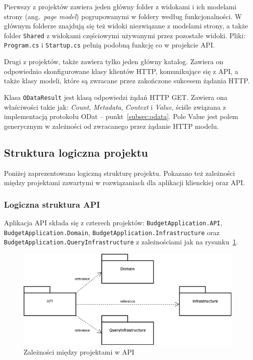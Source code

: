 Pierwszy z projektów zawiera jeden główny folder z widokami i ich modelami strony (ang.~\emph{page model}) pogrupowanymi w foldery według funkcjonalności. W głównym folderze znajdują się też widoki niezwiązane z modelami strony, a także folder \texttt{Shared} z widokami częściowymi używanymi przez pozostałe widoki. Pliki: \texttt{Program.cs} i \texttt{Startup.cs} pełnią podobną funkcję co w projekcie API.

Drugi z projektów, także zawiera tylko jeden główny katalog. Zawiera on odpowiednio skonfigurowane klasy klientów HTTP, komunikujące się z API, a także klasy modeli, które są zwracane przez zakończone sukcesem żądania HTTP.

Klasa \texttt{ODataResult} jest klasą odpowiedzi żądań HTTP GET. Zawiera ona właściwości takie jak: \emph{Count}, \emph{Metadata}, \emph{Context} i \emph{Value}, ściśle związana z implementacją protokołu ODat -- punkt~\ref{subsec:odata}. Pole Value jest polem generycznym w zależności od zwracanego przez żądanie HTTP modelu. 


\subsection{Struktura logiczna projektu}
\label{sec:struktura-logiczna-projektu}
Poniżej zaprezentowano logiczną strukturę projektu. Pokazano też zależności między projektami zawartymi w rozwiązaniach dla aplikacji klienckiej oraz API.

\subsubsection{Logiczna struktura API}
Aplikacja API składa się z czterech projektów: \texttt{BudgetApplication.API}, \texttt{BudgetApplication.Domain}, \texttt{BudgetApplication.Infrastructure} oraz \texttt{BudgetApplication.QueryInfrastructure} z zależnościami jak na rysunku~\ref{fig:api-arch}. 
\begin{figure}[ht]
	\centering
	\includegraphics[scale=.55]{rys04/api-arch.png}
	\caption{Zależności między projektami w API}
	\label{fig:api-arch}
\end{figure}

